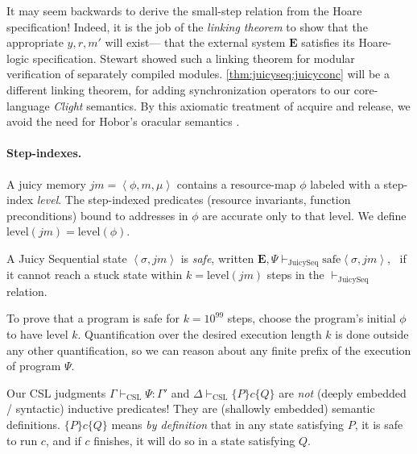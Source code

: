 It may seem backwards to derive the small-step relation from
the Hoare specification!
Indeed, it is the job of the \emph{linking theorem} to
show that the appropriate $y,r, m'$ will exist---
that the external system
$\mathbf{E}$ satisfies its Hoare-logic specification.
Stewart \cite[Thm. 9]{stewart15:phd} showed such a
linking theorem for modular verification of separately compiled modules.
\autoref{thm:juicyseq:juicyconc} will be
a different linking theorem, for
adding synchronization operators to our core-language \emph{Clight} semantics.
By this axiomatic treatment of 
acquire and release, we avoid
the need for Hobor's oracular semantics \cite{hobor08:esop}.

\paragraph{Step-indexes.}
A juicy memory $\mathit{jm}=\left<\phi,m,\mu\right>$
contains a resource-map $\phi$ labeled with a
step-index \emph{level}.
The step-indexed predicates 
(resource invariants, function preconditions)
bound to addresses in $\phi$  are
accurate only to that level.
We define $\mathrm{level}(\mathit{jm})=\mathrm{level}(\phi)$.

\begin{definition}
\label{def:seqsafe}
A Juicy Sequential state $\left<\sigma,\mathit{jm}\right>$ is \emph{safe},
written \linebreak
 $\mathbf{E}, \Psi \vdash_\mathrm{JuicySeq} \mathrm{safe}\left<\sigma,\mathit{jm}\right>$,
\ if it cannot reach a stuck state within $k=\mathrm{level}(\mathit{jm})$ steps
in the $\vdash_\mathrm{JuicySeq}$ relation.  \cite[page 393]{appel14:plcc}
\end{definition}

To prove that a program is safe for $k=10^{99}$ steps,
choose the program's initial $\phi$ to have level $k$.
Quantification over the desired execution length $k$
is done outside any other quantification,
so we can reason about any finite prefix of the execution of program $\Psi$.

Our CSL
judgments $\Gamma \vdash_\mathrm{CSL} \Psi:\Gamma'$
and $\Delta \vdash_\mathrm{CSL}\{P\} c \{Q\}$
are \emph{not} (deeply embedded / syntactic) inductive predicates!
They are (shallowly embedded) semantic definitions.
  $\{P\}c\{Q\}$ means \emph{by definition} \cite[Chapter 43]{appel14:plcc}
  that in any
  state satisfying $P$, it is safe to run $c$, and if $c$
  finishes, it will do so in a state satisfying $Q$.

